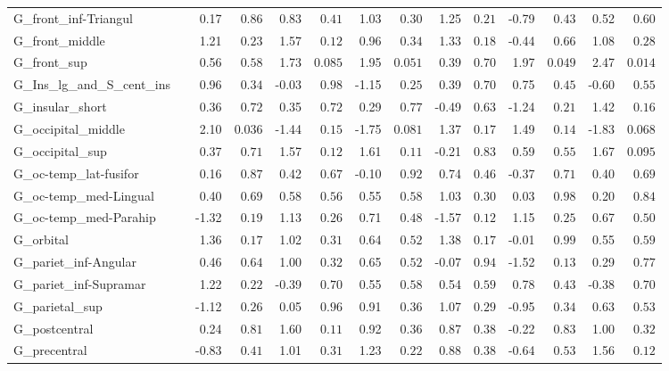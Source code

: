 {\begin{longtable}{llrrrrrrrrrrrr}
G\_front\_inf-Triangul &  & 0.17 & $0.86$ & 0.83 & $0.41$ & 1.03 & $0.30$ & 1.25 & $0.21$ & -0.79 & $0.43$ & 0.52 & $0.60$ \\
G\_front\_middle &  & 1.21 & $0.23$ & 1.57 & $0.12$ & 0.96 & $0.34$ & 1.33 & $0.18$ & -0.44 & $0.66$ & 1.08 & $0.28$ \\
G\_front\_sup &  & 0.56 & $0.58$ & 1.73 & $0.085$ & 1.95 & $0.051$ & 0.39 & $0.70$ & 1.97 & $0.049$ & 2.47 & $0.014$ \\
G\_Ins\_lg\_and\_S\_cent\_ins &  & 0.96 & $0.34$ & -0.03 & $0.98$ & -1.15 & $0.25$ & 0.39 & $0.70$ & 0.75 & $0.45$ & -0.60 & $0.55$ \\
G\_insular\_short &  & 0.36 & $0.72$ & 0.35 & $0.72$ & 0.29 & $0.77$ & -0.49 & $0.63$ & -1.24 & $0.21$ & 1.42 & $0.16$ \\
G\_occipital\_middle &  & 2.10 & $0.036$ & -1.44 & $0.15$ & -1.75 & $0.081$ & 1.37 & $0.17$ & 1.49 & $0.14$ & -1.83 & $0.068$ \\
G\_occipital\_sup &  & 0.37 & $0.71$ & 1.57 & $0.12$ & 1.61 & $0.11$ & -0.21 & $0.83$ & 0.59 & $0.55$ & 1.67 & $0.095$ \\
G\_oc-temp\_lat-fusifor &  & 0.16 & $0.87$ & 0.42 & $0.67$ & -0.10 & $0.92$ & 0.74 & $0.46$ & -0.37 & $0.71$ & 0.40 & $0.69$ \\
G\_oc-temp\_med-Lingual &  & 0.40 & $0.69$ & 0.58 & $0.56$ & 0.55 & $0.58$ & 1.03 & $0.30$ & 0.03 & $0.98$ & 0.20 & $0.84$ \\
G\_oc-temp\_med-Parahip &  & -1.32 & $0.19$ & 1.13 & $0.26$ & 0.71 & $0.48$ & -1.57 & $0.12$ & 1.15 & $0.25$ & 0.67 & $0.50$ \\
G\_orbital &  & 1.36 & $0.17$ & 1.02 & $0.31$ & 0.64 & $0.52$ & 1.38 & $0.17$ & -0.01 & $0.99$ & 0.55 & $0.59$ \\
G\_pariet\_inf-Angular &  & 0.46 & $0.64$ & 1.00 & $0.32$ & 0.65 & $0.52$ & -0.07 & $0.94$ & -1.52 & $0.13$ & 0.29 & $0.77$ \\
G\_pariet\_inf-Supramar &  & 1.22 & $0.22$ & -0.39 & $0.70$ & 0.55 & $0.58$ & 0.54 & $0.59$ & 0.78 & $0.43$ & -0.38 & $0.70$ \\
G\_parietal\_sup &  & -1.12 & $0.26$ & 0.05 & $0.96$ & 0.91 & $0.36$ & 1.07 & $0.29$ & -0.95 & $0.34$ & 0.63 & $0.53$ \\
G\_postcentral &  & 0.24 & $0.81$ & 1.60 & $0.11$ & 0.92 & $0.36$ & 0.87 & $0.38$ & -0.22 & $0.83$ & 1.00 & $0.32$ \\
G\_precentral &  & -0.83 & $0.41$ & 1.01 & $0.31$ & 1.23 & $0.22$ & 0.88 & $0.38$ & -0.64 & $0.53$ & 1.56 & $0.12$ \\

\end{longtable}}
